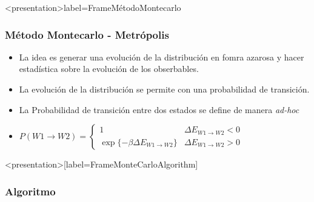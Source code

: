 \mode*

\begin{frame}<presentation>{label=FrameMétodoMontecarlo}
  \frametitle{Método Montecarlo - Metrópolis}
  \begin{itemize}
     \item La idea es generar una evolución de la distribución en fomra azarosa
     y hacer estadística sobre la evolución de los obserbables.
     \item La evolución de la distribución se permite con una probabilidad de transición.
     \item La Probabilidad de transición entre dos estados se define de manera \emph{ ad-hoc}
     \item 
       $P( W1 \longrightarrow W2 ) = 
       \left\{ 
       \begin{array}{ll}
	 1 & \Delta E _{ W1 \rightarrow W2 } <0 \\
	 \exp \{- \beta \Delta E_{ W1 \rightarrow W2 }\} & \Delta E _{ W1 \rightarrow W2 } >0
       \end{array}
       \right.
       $
      
  \end{itemize}
\end{frame}

\begin{frame}<presentation>[label=FrameMonteCarloAlgorithm]
  \frametitle{Algoritmo}
     

\end{frame}
